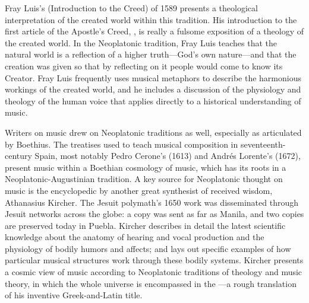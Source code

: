 Fray Luis's  (Introduction to the
Creed) of 1589 presents a theological interpretation of the created world
within this tradition.
His introduction to the first article of the Apostle's Creed, , is really a fulsome
exposition of a theology of the created world.
In the Neoplatonic tradition, Fray Luis teaches that the natural world is a
reflection of a higher truth---God's own nature---and that the creation was
given so that by reflecting on it people would come to know its Creator.
Fray Luis frequently uses musical metaphors to describe the harmonious workings
of the created world, and he includes a discussion of the physiology and
theology of the human voice that applies directly to a historical understanding
of music.

Writers on music drew on Neoplatonic traditions as well, especially as
articulated by Boethius.
The treatises used to teach musical composition in seventeenth-century Spain,
most notably Pedro Cerone's  (1613) and Andrés
Lorente's  (1672), present music within a
Boethian cosmology of music, which has its roots in a Neoplatonic-Augustinian
tradition.
A key source for Neoplatonic thought on music is the encyclopedic
 by another great synthesist of received wisdom,
Athanasius Kircher.%
    \Autocite{Kircher:Musurgia}
The Jesuit polymath's 1650 work was disseminated through Jesuit networks across
the globe: a copy was sent as far as Manila, and two copies are preserved today
in Puebla.
Kircher describes in detail the latest scientific knowledge about the anatomy
of hearing and vocal production and the physiology of bodily humors and
affects; and lays out specific examples of how particular musical structures
work through these bodily systems.
Kircher presents a cosmic view of music according to Neoplatonic traditions of
theology and music theory, in which the whole universe is encompassed in the
---a rough translation of his inventive
Greek-and-Latin title.%

